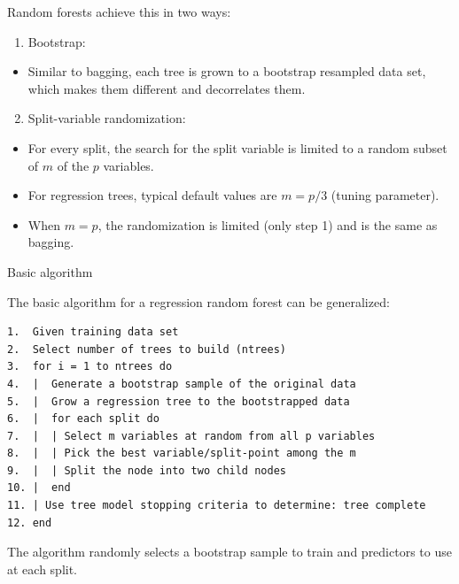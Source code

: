 \documentclass[
  10pt,
  ignorenonframetext,
]{beamer}
\providecommand{\tightlist}{%
  \setlength{\itemsep}{0pt}\setlength{\parskip}{0pt}}
\begin{document}
\begin{frame}{Random forests achieve this in two ways:}
\protect\hypertarget{random-forests-achieve-this-in-two-ways}{}

\begin{enumerate}
[1)]
\tightlist
\item
  Bootstrap:
\end{enumerate}

\begin{itemize}
\tightlist
\item
  Similar to bagging, each tree is grown to a bootstrap resampled data
  set, which makes them different and decorrelates them.
\end{itemize}

\begin{enumerate}
[1)]
\setcounter{enumi}{1}
\tightlist
\item
  Split-variable randomization:
\end{enumerate}

\begin{itemize}
\tightlist
\item
  For every split, the search for the split variable is limited to a
  random subset of \(m\) of the \(p\) variables. 
\item
  For regression trees, typical default values are \(m=p/3\) (tuning
  parameter).
\item
  When \(m=p\), the randomization is limited (only step 1) and is the
  same as bagging.
\end{itemize}

\end{frame}

\begin{frame}[fragile]{Basic algorithm}
\protect\hypertarget{basic-algorithm}{}

The basic algorithm for a regression random forest can be generalized:

\begin{verbatim}
1.  Given training data set
2.  Select number of trees to build (ntrees)
3.  for i = 1 to ntrees do
4.  |  Generate a bootstrap sample of the original data
5.  |  Grow a regression tree to the bootstrapped data
6.  |  for each split do
7.  |  | Select m variables at random from all p variables
8.  |  | Pick the best variable/split-point among the m
9.  |  | Split the node into two child nodes
10. |  end
11. | Use tree model stopping criteria to determine: tree complete 
12. end
\end{verbatim}

The algorithm randomly selects a bootstrap sample to train and
predictors to use at each split.

\end{frame}
\end{document}
